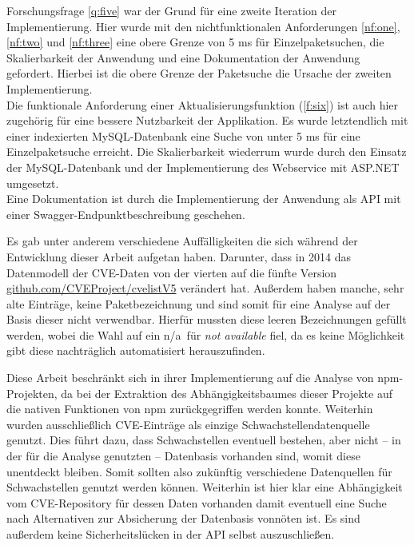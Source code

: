     Forschungsfrage \ref{q:five} war der Grund für eine zweite Iteration der Implementierung.
    Hier wurde mit den nichtfunktionalen Anforderungen \ref{nf:one}, \ref{nf:two} und \ref{nf:three} eine obere Grenze von 5 ms für Einzelpaketsuchen, die Skalierbarkeit der Anwendung und eine Dokumentation der Anwendung gefordert.
    Hierbei ist die obere Grenze der Paketsuche die Ursache der zweiten Implementierung.
    \\
    Die funktionale Anforderung einer Aktualisierungsfunktion (\ref{f:six}) ist auch hier zugehörig für eine bessere Nutzbarkeit der Applikation.
    Es wurde letztendlich mit einer indexierten MySQL-Datenbank eine Suche von unter 5 ms für eine Einzelpaketsuche erreicht.
    Die Skalierbarkeit wiederrum wurde durch den Einsatz der MySQL-Datenbank und der Implementierung des Webservice mit ASP.NET umgesetzt.
    \\
    Eine Dokumentation ist durch die Implementierung der Anwendung als \ac{API} mit einer Swagger-Endpunktbeschreibung geschehen.

    Es gab unter anderem verschiedene Auffälligkeiten die sich während der Entwicklung dieser Arbeit aufgetan haben.
    Darunter, dass in 2014 das Datenmodell der CVE-Daten von der vierten auf die fünfte Version \href{https://github.com/CVEProject/cvelistV5}{github.com/CVEProject/cvelistV5} verändert hat.
    Außerdem haben manche, sehr alte Einträge, keine Paketbezeichnung und sind somit für eine Analyse auf der Basis dieser nicht verwendbar.
    Hierfür mussten diese leeren Bezeichnungen gefüllt werden, wobei die Wahl auf ein \glqq n/a\grqq~für \textit{not available} fiel, da es keine Möglichkeit gibt diese nachträglich automatisiert herauszufinden.

    Diese Arbeit beschränkt sich in ihrer Implementierung auf die Analyse von npm-Projekten, da bei der Extraktion des Abhängigkeitsbaumes dieser Projekte auf die nativen Funktionen von npm zurückgegriffen werden konnte.
    Weiterhin wurden ausschließlich \ac{CVE}-Einträge als einzige Schwachstellendatenquelle genutzt.
    Dies führt dazu, dass Schwachstellen eventuell bestehen, aber nicht -- in der für die Analyse genutzten -- Datenbasis vorhanden sind, womit diese unentdeckt bleiben.
    Somit sollten also zukünftig verschiedene Datenquellen für Schwachstellen genutzt werden können.
    Weiterhin ist hier klar eine Abhängigkeit vom \ac{CVE}-Repository für dessen Daten vorhanden damit eventuell eine Suche nach Alternativen zur Absicherung der Datenbasis vonnöten ist.
    Es sind außerdem keine Sicherheitslücken in der \ac{API} selbst auszuschließen.

